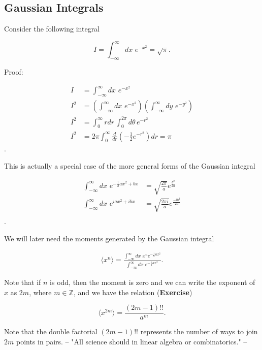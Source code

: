 \subsection*{Gaussian Integrals}

\noindent Consider the following integral 

\begin{equation}
I = \int_{-\infty}^\infty dx \,\, e^{-x^2} = \sqrt{\pi}.
\end{equation}

\noindent Proof:

\begin{align}
I &= \int_{-\infty}^\infty dx \,\, e^{-x^2} \\
I^2 &= \left(\int_{-\infty}^\infty dx \,\, e^{-x^2} \right) \left( \int_{-\infty}^\infty dy \,\, e^{-y^2}  \right) \\
I^2 &= \int_0^\infty r dr \, \int_0^{2\pi} d\theta \, e^{-r^2} \\
I^2 &= 2 \pi \int_0^\infty \frac{d}{dr} \left( -\frac{1}{2} e^{-r^2} \right) dr = \pi
\end{align} .

\noindent This is actually a special case of the more general forms of the Gaussian integral

\begin{align}
\int_{-\infty}^\infty dx \,\, e^{ -\frac{1}{2} a x^2 + b x } &= \sqrt{\frac{2\pi}{a}} e^{ \frac{b^2}{2a}  } \\
\int_{-\infty}^\infty dx \,\, e^{  i a x^2 + i b x } &= \sqrt{\frac{2\pi i}{a}} e^{ \frac{-i b^2}{2a}  } \\
\end{align}.

\noindent We will later need the moments generated by the Gaussian integral

\begin{align}
\langle x^n \rangle = \frac{\int_{-\infty}^\infty dx \,\, x^n e^{ -\frac{1}{2} a x^2}}{\int_{-\infty}^\infty dx \,\, e^{ -\frac{1}{2} a x^2}}.
\end{align}

\noindent Note that if $n$ is odd, then the moment is zero and we can write the exponent of $x$ as $2m$, where $m \in \mathbb{Z}$, and we have the relation (\textbf{Exercise})

\begin{equation}
\langle x^{2m} \rangle = \frac{(2m-1)!!}{a^m}.
\end{equation}

\noindent Note that the double factorial $(2m-1)!!$ represents the number of ways to join $2m$ points in pairs. -- "All science should in linear algebra or combinatorics." -- \\

